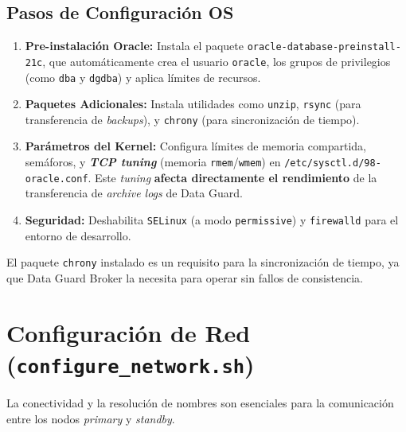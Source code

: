 \documentclass[11pt, a4paper]{report}
\begin{document}
\subsection{Pasos de Configuración OS}
\begin{enumerate}
    \item \textbf{Pre-instalación Oracle:} Instala el paquete \texttt{oracle-database-preinstall-21c}, que automáticamente crea el usuario \texttt{oracle}, los grupos de privilegios (como \texttt{dba} y \texttt{dgdba}) y aplica límites de recursos.
\item \textbf{Paquetes Adicionales:} Instala utilidades como \texttt{unzip}, \texttt{rsync} (para transferencia de \textit{backups}), y \texttt{chrony} (para sincronización de tiempo).
\item \textbf{Parámetros del Kernel:} Configura límites de memoria compartida, semáforos, y \textbf{\textit{TCP tuning}} (memoria \texttt{rmem}/\texttt{wmem}) en \texttt{/etc/sysctl.d/98-oracle.conf}.
Este \textit{tuning} \textbf{afecta directamente el rendimiento} de la transferencia de \textit{archive logs} de Data Guard.
\item \textbf{Seguridad:} Deshabilita \texttt{SELinux} (a modo \texttt{permissive}) y \texttt{firewalld} para el entorno de desarrollo.
\end{enumerate}
El paquete \texttt{chrony} instalado es un requisito para la sincronización de tiempo, ya que Data Guard Broker la necesita para operar sin fallos de consistencia.

\section{Configuración de Red (\texttt{configure\_network.sh})}

La conectividad y la resolución de nombres son esenciales para la comunicación entre los nodos \textit{primary} y \textit{standby}.
\end{document}

